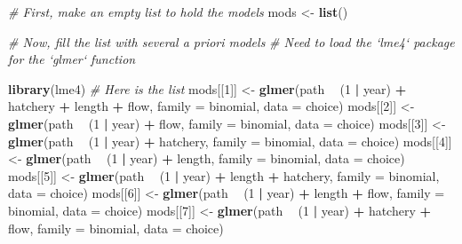 \documentclass[
]{book}
\newenvironment{Shaded}{\begin{snugshade}}{\end{snugshade}}
\newcommand{\CommentTok}[1]{\textcolor[rgb]{0.56,0.35,0.01}{\textit{#1}}}
\newcommand{\DataTypeTok}[1]{\textcolor[rgb]{0.13,0.29,0.53}{#1}}
\newcommand{\DecValTok}[1]{\textcolor[rgb]{0.00,0.00,0.81}{#1}}
\newcommand{\KeywordTok}[1]{\textcolor[rgb]{0.13,0.29,0.53}{\textbf{#1}}}
\newcommand{\NormalTok}[1]{#1}
\newcommand{\OperatorTok}[1]{\textcolor[rgb]{0.81,0.36,0.00}{\textbf{#1}}}
\newcommand{\StringTok}[1]{\textcolor[rgb]{0.31,0.60,0.02}{#1}}
\begin{document}
\begin{Shaded}
\begin{Highlighting}[]
\CommentTok{# First, make an empty list to hold the models}
\NormalTok{mods <-}\StringTok{ }\KeywordTok{list}\NormalTok{()}

\CommentTok{# Now, fill the list with several a priori models}
\CommentTok{# Need to load the `lme4` package for the `glmer` function}

\KeywordTok{library}\NormalTok{(lme4)}
\CommentTok{# Here is the list}
\NormalTok{mods[[}\DecValTok{1}\NormalTok{]] <-}\StringTok{ }\KeywordTok{glmer}\NormalTok{(path }\OperatorTok{~}\StringTok{ }\NormalTok{(}\DecValTok{1} \OperatorTok{|}\StringTok{ }\NormalTok{year) }\OperatorTok{+}\StringTok{ }\NormalTok{hatchery }\OperatorTok{+}\StringTok{ }\NormalTok{length }\OperatorTok{+}\StringTok{ }\NormalTok{flow, }\DataTypeTok{family =}\NormalTok{ binomial, }\DataTypeTok{data =}\NormalTok{ choice)}
\NormalTok{mods[[}\DecValTok{2}\NormalTok{]] <-}\StringTok{ }\KeywordTok{glmer}\NormalTok{(path }\OperatorTok{~}\StringTok{ }\NormalTok{(}\DecValTok{1} \OperatorTok{|}\StringTok{ }\NormalTok{year) }\OperatorTok{+}\StringTok{ }\NormalTok{flow, }\DataTypeTok{family =}\NormalTok{ binomial, }\DataTypeTok{data =}\NormalTok{ choice)}
\NormalTok{mods[[}\DecValTok{3}\NormalTok{]] <-}\StringTok{ }\KeywordTok{glmer}\NormalTok{(path }\OperatorTok{~}\StringTok{ }\NormalTok{(}\DecValTok{1} \OperatorTok{|}\StringTok{ }\NormalTok{year) }\OperatorTok{+}\StringTok{ }\NormalTok{hatchery, }\DataTypeTok{family =}\NormalTok{ binomial, }\DataTypeTok{data =}\NormalTok{ choice)}
\NormalTok{mods[[}\DecValTok{4}\NormalTok{]] <-}\StringTok{ }\KeywordTok{glmer}\NormalTok{(path }\OperatorTok{~}\StringTok{ }\NormalTok{(}\DecValTok{1} \OperatorTok{|}\StringTok{ }\NormalTok{year) }\OperatorTok{+}\StringTok{ }\NormalTok{length, }\DataTypeTok{family =}\NormalTok{ binomial, }\DataTypeTok{data =}\NormalTok{ choice)}
\NormalTok{mods[[}\DecValTok{5}\NormalTok{]] <-}\StringTok{ }\KeywordTok{glmer}\NormalTok{(path }\OperatorTok{~}\StringTok{ }\NormalTok{(}\DecValTok{1} \OperatorTok{|}\StringTok{ }\NormalTok{year) }\OperatorTok{+}\StringTok{ }\NormalTok{length }\OperatorTok{+}\StringTok{ }\NormalTok{hatchery, }\DataTypeTok{family =}\NormalTok{ binomial, }\DataTypeTok{data =}\NormalTok{ choice)}
\NormalTok{mods[[}\DecValTok{6}\NormalTok{]] <-}\StringTok{ }\KeywordTok{glmer}\NormalTok{(path }\OperatorTok{~}\StringTok{ }\NormalTok{(}\DecValTok{1} \OperatorTok{|}\StringTok{ }\NormalTok{year) }\OperatorTok{+}\StringTok{ }\NormalTok{length }\OperatorTok{+}\StringTok{ }\NormalTok{flow, }\DataTypeTok{family =}\NormalTok{ binomial, }\DataTypeTok{data =}\NormalTok{ choice)}
\NormalTok{mods[[}\DecValTok{7}\NormalTok{]] <-}\StringTok{ }\KeywordTok{glmer}\NormalTok{(path }\OperatorTok{~}\StringTok{ }\NormalTok{(}\DecValTok{1} \OperatorTok{|}\StringTok{ }\NormalTok{year) }\OperatorTok{+}\StringTok{ }\NormalTok{hatchery }\OperatorTok{+}\StringTok{ }\NormalTok{flow, }\DataTypeTok{family =}\NormalTok{ binomial, }\DataTypeTok{data =}\NormalTok{ choice)}
\end{Highlighting}
\end{Shaded}
\end{document}
